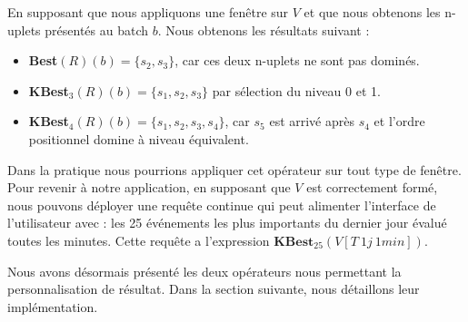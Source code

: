 En supposant que nous appliquons une fenêtre sur $V$ et que nous obtenons les n-uplets présentés au batch $b$. Nous obtenons les résultats suivant : 
\begin{itemize}
	\item \textbf{Best}$(R)(b) = \{s_2,s_3\}$, car ces deux n-uplets ne sont pas dominés.
	\item \textbf{KBest}$_3(R)(b) = \{s_1,s_2,s_3\}$ par sélection du niveau 0 et 1.
	\item \textbf{KBest}$_4(R)(b) = \{s_1,s_2,s_3,s_4\}$, car $s_5$ est arrivé après $s_4$ et l'ordre positionnel domine à niveau équivalent.
\end{itemize}

Dans la pratique nous pourrions appliquer cet opérateur sur tout type de fenêtre. Pour revenir à notre application, en supposant que $V$ est correctement formé, nous pouvons déployer une requête continue qui peut alimenter l'interface de l'utilisateur avec : les 25 événements les plus importants du dernier jour évalué toutes les minutes. Cette requête a l'expression $\textbf{KBest}_{25}(V[T\ 1j\ 1min])$.

Nous avons désormais présenté les deux opérateurs nous permettant la personnalisation de résultat. Dans la section suivante, nous détaillons leur implémentation.
